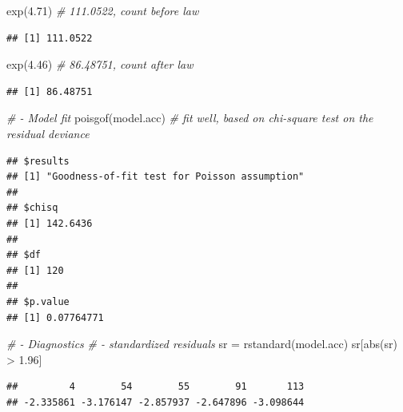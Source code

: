 \documentclass[
]{book}
\makeatletter
\newenvironment{Shaded}{\begin{snugshade}}{\end{snugshade}}
\newcommand{\CommentTok}[1]{\textcolor[rgb]{0.37,0.37,0.37}{\textit{#1}}}
\newcommand{\FloatTok}[1]{\textcolor[rgb]{0.06,0.06,0.06}{#1}}
\newcommand{\FunctionTok}[1]{\textcolor[rgb]{0,0,0}{#1}}
\newcommand{\NormalTok}[1]{#1}
\newcommand{\OtherTok}[1]{\textcolor[rgb]{0.37,0.37,0.37}{#1}}
\newcommand{\SpecialCharTok}[1]{\textcolor[rgb]{0,0,0}{#1}}
\newenvironment{kframe}{%
\medskip{}
\setlength{\fboxsep}{.8em}
 \def\at@end@of@kframe{}%
 \ifinner\ifhmode%
  \def\at@end@of@kframe{\end{minipage}}%
  \begin{minipage}{\columnwidth}%
 \fi\fi%
 \def\FrameCommand##1{\hskip\@totalleftmargin \hskip-\fboxsep
 \colorbox{shadecolor}{##1}\hskip-\fboxsep
     \hskip-\linewidth \hskip-\@totalleftmargin \hskip\columnwidth}%
 \MakeFramed {\advance\hsize-\width
   \@totalleftmargin\z@ \linewidth\hsize
   \@setminipage}}%
 {\par\unskip\endMakeFramed%
 \at@end@of@kframe}
\renewenvironment{Shaded}{\begin{kframe}}{\end{kframe}}
\makeatother
\begin{document}
\begin{Shaded}
\begin{Highlighting}[]
\FunctionTok{exp}\NormalTok{(}\FloatTok{4.71}\NormalTok{)  }\CommentTok{\# 111.0522, count before law}
\end{Highlighting}
\end{Shaded}

\begin{verbatim}
## [1] 111.0522
\end{verbatim}

\begin{Shaded}
\begin{Highlighting}[]
\FunctionTok{exp}\NormalTok{(}\FloatTok{4.46}\NormalTok{)  }\CommentTok{\# 86.48751, count after law}
\end{Highlighting}
\end{Shaded}

\begin{verbatim}
## [1] 86.48751
\end{verbatim}

\begin{Shaded}
\begin{Highlighting}[]
\CommentTok{\# {-} Model fit}
\FunctionTok{poisgof}\NormalTok{(model.acc)  }\CommentTok{\# fit well, based on chi{-}square test on the residual deviance}
\end{Highlighting}
\end{Shaded}

\begin{verbatim}
## $results
## [1] "Goodness-of-fit test for Poisson assumption"
## 
## $chisq
## [1] 142.6436
## 
## $df
## [1] 120
## 
## $p.value
## [1] 0.07764771
\end{verbatim}

\begin{Shaded}
\begin{Highlighting}[]
\CommentTok{\# {-} Diagnostics}
\CommentTok{\#   {-} standardized residuals}
\NormalTok{sr }\OtherTok{=} \FunctionTok{rstandard}\NormalTok{(model.acc)}
\NormalTok{sr[}\FunctionTok{abs}\NormalTok{(sr) }\SpecialCharTok{\textgreater{}} \FloatTok{1.96}\NormalTok{]}
\end{Highlighting}
\end{Shaded}

\begin{verbatim}
##         4        54        55        91       113 
## -2.335861 -3.176147 -2.857937 -2.647896 -3.098644
\end{verbatim}
\end{document}
